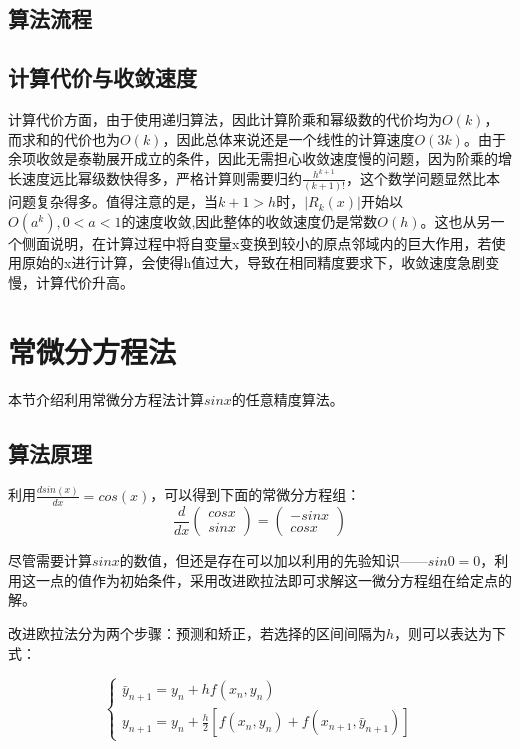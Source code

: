 \documentclass[UTF8]{ctexart}
\begin{document}
\subsection{算法流程}

\subsection{计算代价与收敛速度}
计算代价方面，由于使用递归算法，因此计算阶乘和幂级数的代价均为$O(k)$，而求和的代价也为$O(k)$，因此总体来说还是一个线性的计算速度$O(3k)$。由于余项收敛是泰勒展开成立的条件，因此无需担心收敛速度慢的问题，因为阶乘的增长速度远比幂级数快得多，严格计算则需要归约$\frac{h^{k+1}}{(k+1)!}$，这个数学问题显然比本问题复杂得多。值得注意的是，当$k+1>h$时，$|R_k(x)|$开始以$O(a^{k}),0<a<1$的速度收敛,因此整体的收敛速度仍是常数$O(h)$。这也从另一个侧面说明，在计算过程中将自变量x变换到较小的原点邻域内的巨大作用，若使用原始的x进行计算，会使得h值过大，导致在相同精度要求下，收敛速度急剧变慢，计算代价升高。
\section{常微分方程法}

本节介绍利用常微分方程法计算$sinx$的任意精度算法。

\subsection{算法原理}
利用$\frac{dsin(x)}{dx}=cos(x)$，可以得到下面的常微分方程组：
\begin{equation}
    \frac{d}{dx}\left(
    \begin{matrix}
            cosx \\
            sinx
        \end{matrix}
    \right)=\left(
    \begin{matrix}
            -sinx \\
            cosx
        \end{matrix}
    \right)
\end{equation}

尽管需要计算$sinx$的数值，但还是存在可以加以利用的先验知识——$sin0 = 0$，利用这一点的值作为初始条件，采用改进欧拉法即可求解这一微分方程组在给定点的解。

改进欧拉法分为两个步骤：预测和矫正，若选择的区间间隔为$h$，则可以表达为下式：

\begin{equation}
    \begin{cases}
        \bar{y}_{n+1}=y_n+hf(x_n,y_n) \\
        y_{n+1}=y_n+\frac{h}{2}[f(x_n,y_n)+f(x_{n+1},\bar{y}_{n+1})]
    \end{cases}
\end{equation}
\end{document}
